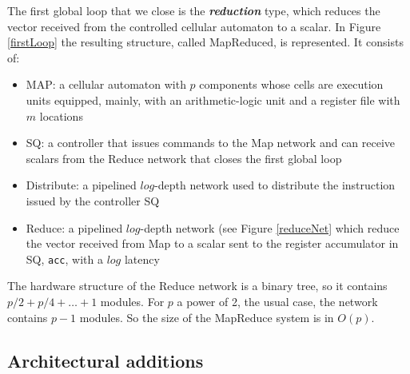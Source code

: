 The first global loop that we close is the {\bf {\em reduction}} type, which reduces the vector received from the controlled cellular automaton to a scalar. In Figure \ref{firstLoop} the resulting structure, called MapReduced, is represented. It consists of:


\begin{itemize}
    \item MAP: a cellular automaton with $p$ components whose cells are execution units equipped, mainly, with an arithmetic-logic unit and a register file with $m$ locations
    \item SQ: a controller that issues commands to the Map network and can receive scalars from the Reduce network that closes the first global loop
    \item Distribute: a pipelined $log$-depth network used to distribute the instruction issued by the controller SQ    
    \item Reduce: a pipelined $log$-depth network (see Figure \ref{reduceNet}  which reduce the vector received from Map to a scalar sent to the register accumulator in SQ, {\tt acc}, with a $log$ latency
\end{itemize}


The hardware structure of the Reduce network is a binary tree, so it contains $p/2 + p/4 + \ldots + 1$ modules. For $p$ a power of 2, the usual case, the network contains $p-1$ modules. So the size of the MapReduce system is in $O(p)$.

\subsection{Architectural additions}\label{redEx}

